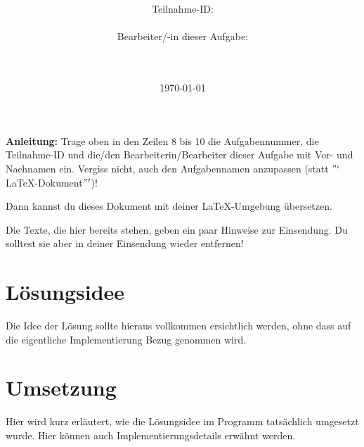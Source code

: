 \documentclass[a4paper,10pt,ngerman]{scrartcl}
\title{\textbf{\Huge\Aufgabe}}
\author{\LARGE Teilnahme-ID: \LARGE \TeilnahmeId \\\\
\LARGE Bearbeiter/-in dieser Aufgabe: \\
\LARGE \Name\\\\}
\date{\LARGE\today}
\begin{document}
    \maketitle
    \tableofcontents
    \vspace{0.5cm}

    \textbf{Anleitung:} Trage oben in den Zeilen 8 bis 10 die Aufgabennummer,
    die Teilnahme-ID und die/den Bearbeiterin/Bearbeiter dieser Aufgabe mit Vor- und Nachnamen ein.
    Vergiss nicht, auch den Aufgabennamen anzupassen (statt \("`\)\LaTeX-Dokument\("'\))!

    Dann kannst du dieses Dokument mit deiner \LaTeX-Umgebung übersetzen.

    Die Texte, die hier bereits stehen, geben ein paar Hinweise zur
    Einsendung.
    Du solltest sie aber in deiner Einsendung wieder entfernen!

    \newpage
    \section{Lösungsidee}\label{sec:losungsidee}
    Die Idee der Lösung sollte hieraus vollkommen ersichtlich werden,
    ohne dass auf die eigentliche Implementierung Bezug genommen wird.
    
    

    \newpage
    \section{Umsetzung}\label{sec:umsetzung}
    Hier wird kurz erläutert, wie die Lösungsidee im Programm tatsächlich umgesetzt wurde.
    Hier können auch Implementierungsdetails erwähnt werden.
\end{document}
